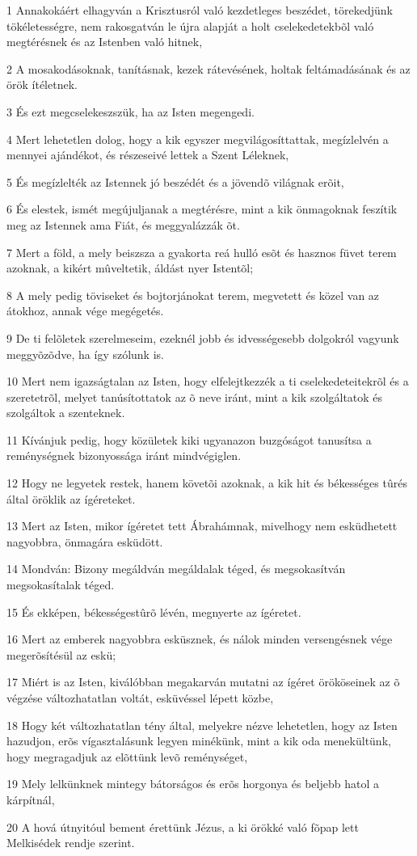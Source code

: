 \par 1 Annakokáért elhagyván a Krisztusról való kezdetleges beszédet, törekedjünk tökéletességre, nem rakosgatván le újra alapját a holt cselekedetekbõl való megtérésnek és az Istenben való hitnek,
\par 2 A mosakodásoknak, tanításnak, kezek rátevésének, holtak feltámadásának és az örök ítéletnek.
\par 3 És ezt megcselekeszszük, ha az Isten megengedi.
\par 4 Mert lehetetlen dolog, hogy a kik egyszer megvilágosíttattak, megízlelvén a mennyei ajándékot, és részeseivé lettek a Szent Léleknek,
\par 5 És megízlelték az Istennek jó beszédét és a jövendõ világnak erõit,
\par 6 És elestek, ismét megújuljanak a megtérésre, mint a kik önmagoknak feszítik meg az Istennek ama Fiát, és meggyalázzák õt.
\par 7 Mert a föld, a mely beiszsza a gyakorta reá hulló esõt és hasznos füvet terem azoknak, a kikért mûveltetik, áldást nyer Istentõl;
\par 8 A mely pedig töviseket és bojtorjánokat terem, megvetett és közel van az átokhoz, annak vége megégetés.
\par 9 De ti felõletek szerelmeseim, ezeknél jobb és idvességesebb dolgokról vagyunk meggyõzõdve, ha így szólunk is.
\par 10 Mert nem igazságtalan az Isten, hogy elfelejtkezzék a ti cselekedeteitekrõl és a szeretetrõl, melyet tanúsítottatok az õ neve iránt, mint a kik szolgáltatok és szolgáltok a szenteknek.
\par 11 Kívánjuk pedig, hogy közületek kiki ugyanazon buzgóságot tanusítsa a reménységnek bizonyossága iránt mindvégiglen.
\par 12 Hogy ne legyetek restek, hanem követõi azoknak, a kik hit és békességes tûrés által öröklik az ígéreteket.
\par 13 Mert az Isten, mikor ígéretet tett Ábrahámnak, mivelhogy nem esküdhetett nagyobbra, önmagára esküdött.
\par 14 Mondván: Bizony megáldván megáldalak téged, és megsokasítván megsokasítalak téged.
\par 15 És ekképen, békességestûrõ lévén, megnyerte az ígéretet.
\par 16 Mert az emberek nagyobbra esküsznek, és nálok minden versengésnek vége megerõsítésül az eskü;
\par 17 Miért is az Isten, kiválóbban megakarván mutatni az ígéret örököseinek az õ végzése változhatatlan voltát, esküvéssel lépett közbe,
\par 18 Hogy két változhatatlan tény által, melyekre nézve lehetetlen, hogy az Isten hazudjon, erõs vígasztalásunk legyen minékünk, mint a kik oda menekültünk, hogy megragadjuk az elõttünk levõ reménységet,
\par 19 Mely lelkünknek mintegy bátorságos és erõs horgonya és beljebb hatol a kárpítnál,
\par 20 A hová útnyitóul bement érettünk Jézus, a ki örökké való fõpap lett Melkisédek rendje szerint.

